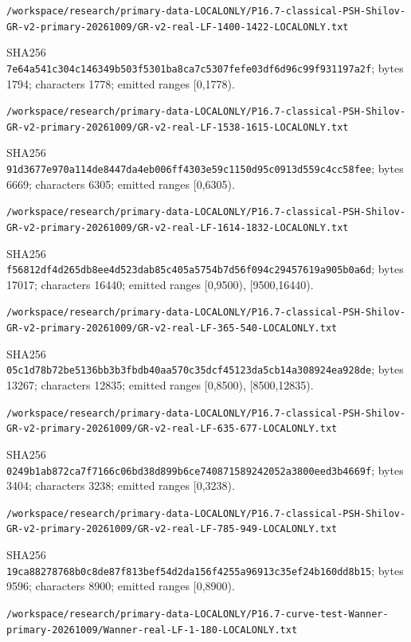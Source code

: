 \documentclass[11pt]{article}
\begin{document}
\texttt{/\allowbreak workspace/\allowbreak research/\allowbreak primary-data-LOCALONLY/\allowbreak P16.7-classical-PSH-Shilov-GR-v2-primary-20261009/\allowbreak GR-v2-real-LF-1400-1422-LOCALONLY.txt}

SHA256 \texttt{7e64a541c304c146349b503f5301ba8ca7c5307fefe03df6d96c99f931197a2f}; bytes 1794; characters 1778; emitted ranges [0,1778).

\texttt{/\allowbreak workspace/\allowbreak research/\allowbreak primary-data-LOCALONLY/\allowbreak P16.7-classical-PSH-Shilov-GR-v2-primary-20261009/\allowbreak GR-v2-real-LF-1538-1615-LOCALONLY.txt}

SHA256 \texttt{91d3677e970a114de8447da4eb006ff4303e59c1150d95c0913d559c4cc58fee}; bytes 6669; characters 6305; emitted ranges [0,6305).

\texttt{/\allowbreak workspace/\allowbreak research/\allowbreak primary-data-LOCALONLY/\allowbreak P16.7-classical-PSH-Shilov-GR-v2-primary-20261009/\allowbreak GR-v2-real-LF-1614-1832-LOCALONLY.txt}

SHA256 \texttt{f56812df4d265db8ee4d523dab85c405a5754b7d56f094c29457619a905b0a6d}; bytes 17017; characters 16440; emitted ranges [0,9500), [9500,16440).

\texttt{/\allowbreak workspace/\allowbreak research/\allowbreak primary-data-LOCALONLY/\allowbreak P16.7-classical-PSH-Shilov-GR-v2-primary-20261009/\allowbreak GR-v2-real-LF-365-540-LOCALONLY.txt}

SHA256 \texttt{05c1d78b72be5136bb3b3fbdb40aa570c35dcf45123da5cb14a308924ea928de}; bytes 13267; characters 12835; emitted ranges [0,8500), [8500,12835).

\texttt{/\allowbreak workspace/\allowbreak research/\allowbreak primary-data-LOCALONLY/\allowbreak P16.7-classical-PSH-Shilov-GR-v2-primary-20261009/\allowbreak GR-v2-real-LF-635-677-LOCALONLY.txt}

SHA256 \texttt{0249b1ab872ca7f7166c06bd38d899b6ce740871589242052a3800eed3b4669f}; bytes 3404; characters 3238; emitted ranges [0,3238).

\texttt{/\allowbreak workspace/\allowbreak research/\allowbreak primary-data-LOCALONLY/\allowbreak P16.7-classical-PSH-Shilov-GR-v2-primary-20261009/\allowbreak GR-v2-real-LF-785-949-LOCALONLY.txt}

SHA256 \texttt{19ca88278768b0c8de87f813bef54d2da156f4255a96913c35ef24b160dd8b15}; bytes 9596; characters 8900; emitted ranges [0,8900).

\texttt{/\allowbreak workspace/\allowbreak research/\allowbreak primary-data-LOCALONLY/\allowbreak P16.7-curve-test-Wanner-primary-20261009/\allowbreak Wanner-real-LF-1-180-LOCALONLY.txt}
\end{document}
